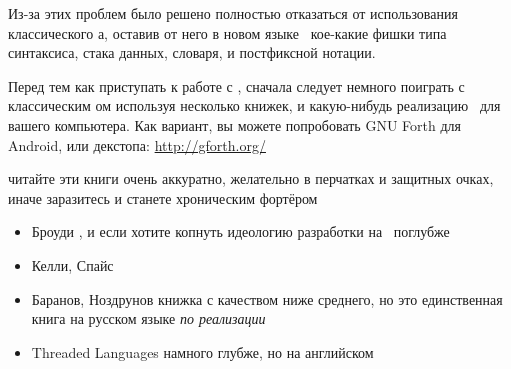 \noindent
Из-за этих проблем было решено полностью отказаться от использования
классического \F а, оставив от него в новом языке \metal\ кое-какие фишки типа
синтаксиса, стака данных, словаря, и постфиксной нотации.

\clearpage
Перед тем как приступать к работе с \metal, сначала следует немного поиграть с
классическим \F ом используя несколько книжек, и какую-нибудь реализацию \F\ для
вашего компьютера. Как вариант, вы можете попробовать GNU Forth для Android, или
декстопа: \url{http://gforth.org/}

\begin{framed}\noindent
читайте эти книги очень аккуратно, желательно в перчатках и защитных очках,
иначе заразитесь и станете хроническим фортёром
\end{framed}

\begin{itemize}[nosep]
  \item Броуди \cite{starting}, и \cite{thinking} если хотите копнуть идеологию
  разработки на \F\ поглубже
  \item Келли, Спайс \cite{kelly}
  \item Баранов, Ноздрунов \cite{baranov} книжка с качеством ниже среднего, но
  это единственная книга на русском языке \emph{по реализации} \F
  \item Threaded Languages \cite{threaded} намного глубже, но на английском
\end{itemize}

\secup
